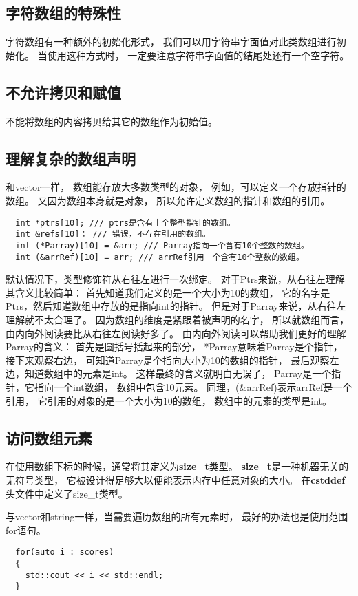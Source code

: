 \subsection{字符数组的特殊性}
字符数组有一种额外的初始化形式，%
我们可以用字符串字面值对此类数组进行初始化。%
当使用这种方式时，%
一定要注意字符串字面值的结尾处还有一个空字符。%
\subsection{不允许拷贝和赋值}
不能将数组的内容拷贝给其它的数组作为初始值。%
\subsection{理解复杂的数组声明}
和vector一样，%
数组能存放大多数类型的对象，%
例如，可以定义一个存放指针的数组。%
又因为数组本身就是对象，%
所以允许定义数组的指针和数组的引用。
\begin{lstlisting}
  int *ptrs[10]; /// ptrs是含有十个整型指针的数组。
  int &refs[10]； /// 错误，不存在引用的数组。
  int (*Parray)[10] = &arr; /// Parray指向一个含有10个整数的数组。
  int (&arrRef)[10] = arr; /// arrRef引用一个含有10个整数的数组。
\end{lstlisting}
默认情况下，类型修饰符从右往左进行一次绑定。%
对于Ptrs来说，从右往左理解其含义比较简单：%
首先知道我们定义的是一个大小为10的数组，%
它的名字是Ptrs，然后知道数组中存放的是指向int的指针。%
但是对于Parray来说，从右往左理解就不太合理了。%
因为数组的维度是紧跟着被声明的名字，%
所以就数组而言，由内向外阅读要比从右往左阅读好多了。%
由内向外阅读可以帮助我们更好的理解Parray的含义：%
首先是圆括号括起来的部分，%
*Parray意味着Parray是个指针，%
接下来观察右边，%
可知道Parray是个指向大小为10的数组的指针，%
最后观察左边，知道数组中的元素是int。%
这样最终的含义就明白无误了，%
Parray是一个指针，它指向一个int数组，%
数组中包含10元素。%
同理，(\&arrRef)表示arrRef是一个引用，%
它引用的对象的是一个大小为10的数组，%
数组中的元素的类型是int。
\subsection{访问数组元素}
在使用数组下标的时候，通常将其定义为{\bfseries{size\_t}}类型。%
{\bfseries{size\_t}}是一种机器无关的无符号类型，%
它被设计得足够大以便能表示内存中任意对象的大小。%
在{\bfseries{cstddef}}头文件中定义了size\_t类型。
\par
与vector和string一样，当需要遍历数组的所有元素时，%
最好的办法也是使用范围for语句。
\begin{lstlisting}
  for(auto i : scores)
  {
    std::cout << i << std::endl;
  }
\end{lstlisting}
